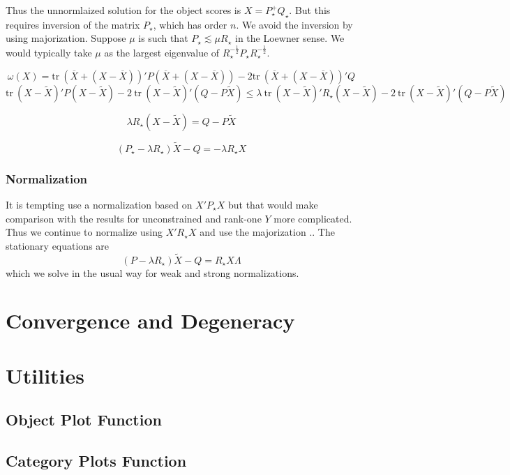 \documentclass[
  12pt,
]{article}
\begin{document}
Thus the unnormlaized solution for the object scores is \(X=P^+_\star Q_\star\). But this requires inversion of the matrix \(P_\star\), which has order \(n\). We avoid the inversion by using majorization. Suppose \(\mu\) is such that \(P_\star\lesssim\mu R_\star\) in the Loewner sense. We would typically take \(\mu\) as the
largest eigenvalue of \(R_\star^{-\frac12}P_\star R_\star^{-\frac12}\).

\[\omega(X)=\text{tr}\ (\overline X+(X-\overline X))'P(\overline X+(X-\overline X))-2\text{tr}\ (\overline X+(X-\overline X))'Q\]
\[
\text{tr}\ (X-\tilde X)'P(X-\tilde X)-2\ \text{tr}\ (X-\tilde X)'(Q-P\tilde X)\leq
\lambda\ \text{tr}\ (X-\tilde X)'R_\star(X-\tilde X)-2\ \text{tr}\ (X-\tilde X)'(Q-P\tilde X)
\]

\[
\lambda R_\star(X-\tilde X)=Q-P\tilde X
\]

\[
(P_\star-\lambda R_\star)\tilde X-Q=-\lambda R_\star X
\]

\subsubsection{Normalization}\label{normalization}

It is tempting use a normalization based on \(X'P_\star X\) but that would make comparison with
the results for unconstrained and rank-one \(Y\) more complicated. Thus we continue
to normalize using \(X'R_\star X\) and use the majorization .. The stationary equations are
\[
(P-\lambda R_\star)\tilde X-Q=R_\star X\Lambda
\]
which we solve in the usual way for weak and strong normalizations.

\section{Convergence and Degeneracy}\label{convergence-and-degeneracy}

\section{Utilities}\label{utilities}

\subsection{Object Plot Function}\label{object-plot-function}

\subsection{Category Plots Function}\label{category-plots-function}
\end{document}
